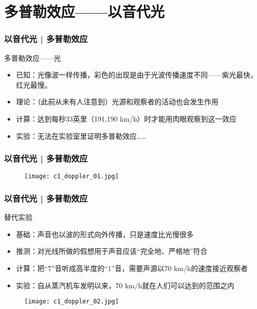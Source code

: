 \section{多普勒效应——以音代光}
\begin{frame}
  \frametitle{以音代光 | 多普勒效应}
  \begin{block}{多普勒效应——光}
    \begin{itemize}
      \item 已知：光像波一样传播，彩色的出现是由于光波传播速度不同——紫光最快，红光最慢。
      \item 理论：（此前从未有人注意到）光源和观察者的活动也会发生作用
      \item 计算：达到每秒33英里（191,190 km/h）时才能用肉眼观察到这一效应
      \item 实验：无法在实验室里证明多普勒效应……
    \end{itemize}
  \end{block}
\end{frame}

\begin{frame}
  \frametitle{以音代光 | 多普勒效应}
    \begin{figure}
      \centering
      \texttt{[image: c1\_doppler\_01.jpg]}
    \end{figure}
\end{frame}

\begin{frame}
  \frametitle{以音代光 | 多普勒效应}
  \begin{block}{替代实验}
    \begin{itemize}
      \item 基础：声音也以波的形式向外传播，只是速度比光慢很多
      \item 推测：对光线所做的假想用于声音应该“完全地、严格地”符合
      \item 计算：把“7”音听成高半度的“1”音，需要声源以70 km/h的速度接近观察者
      \item 实验：自从蒸汽机车发明以来，70 km/h就在人们可以达到的范围之内
    \end{itemize}
    \vspace{-1em}
    \begin{figure}
      \centering
      \texttt{[image: c1\_doppler\_02.jpg]}
    \end{figure}
  \end{block}
\end{frame}

